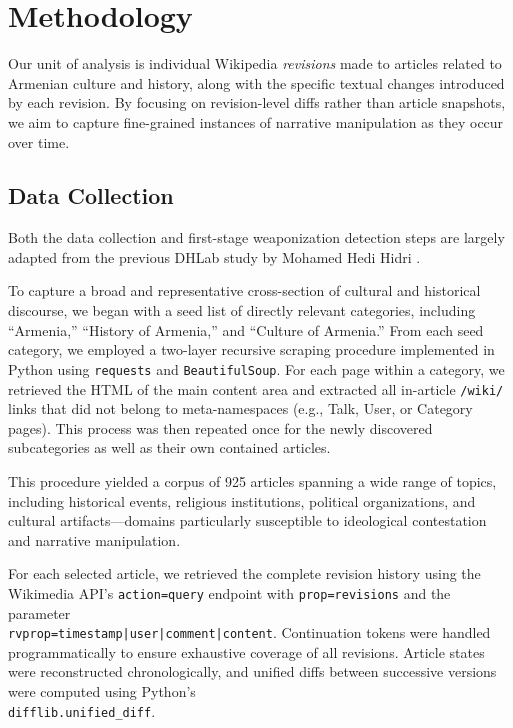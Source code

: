 \documentclass[11pt, a4paper, twoside, openright]{article} %
\begin{document}
\section{Methodology}

Our unit of analysis is individual Wikipedia \textit{revisions} made to articles related to Armenian culture and history, along with the specific textual changes introduced by each revision. By focusing on revision-level diffs rather than article snapshots, we aim to capture fine-grained instances of narrative manipulation as they occur over time.

\subsection{Data Collection}

Both the data collection and first-stage weaponization detection steps are largely adapted from the previous DHLab study by Mohamed Hedi Hidri \cite{hidri2025weaponization}.

To capture a broad and representative cross-section of cultural and historical discourse, we began with a seed list of directly relevant categories, including ``Armenia,'' ``History of Armenia,'' and ``Culture of Armenia.''  From each seed category, we employed a two-layer recursive scraping procedure implemented in Python using \texttt{requests} and \texttt{BeautifulSoup}. For each page within a category, we retrieved the HTML of the main content area and extracted all in-article \texttt{/wiki/} links that did not belong to meta-namespaces (e.g., Talk, User, or Category pages). This process was then repeated once for the newly discovered subcategories as well as their own contained articles.

This procedure yielded a corpus of 925 articles spanning a wide range of topics, including historical events, religious institutions, political organizations, and cultural artifacts—domains particularly susceptible to ideological contestation and narrative manipulation.

For each selected article, we retrieved the complete revision history using the Wikimedia API’s \texttt{action=query} endpoint with \texttt{prop=revisions} and the parameter \\\texttt{rvprop=timestamp|user|comment|content}. Continuation tokens were handled programmatically to ensure exhaustive coverage of all revisions. Article states were reconstructed chronologically, and unified diffs between successive versions were computed using Python’s \\ \texttt{difflib.unified\_diff}.
\end{document}
